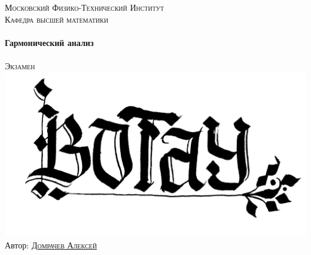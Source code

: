 \begin{titlepage}
\center %
 

\textsc{\LARGE Московский Физико-Технический Институт}\vspace{-15pt}\\[1cm] %
\textsc{\Large Кафедра высшей математики}\\[0.5cm] %



\HRule
\\[0.4cm]
{ \huge \bfseries Гармонический анализ}
\\[0.2cm] %
\HRule
\\[1.5cm]


 
\textsc{\Large  Экзамен}\\[2cm]

\includegraphics[width = 65 mm]{BOTAY.png}\\

Автор: \href{https://vk.com/domrachev_alexey}{\textsc{Домрачев Алексей}}\\














\begin{bottompar}
\begin{flushright} \large
		

\end{flushright}
\end{bottompar}
\end{titlepage}

